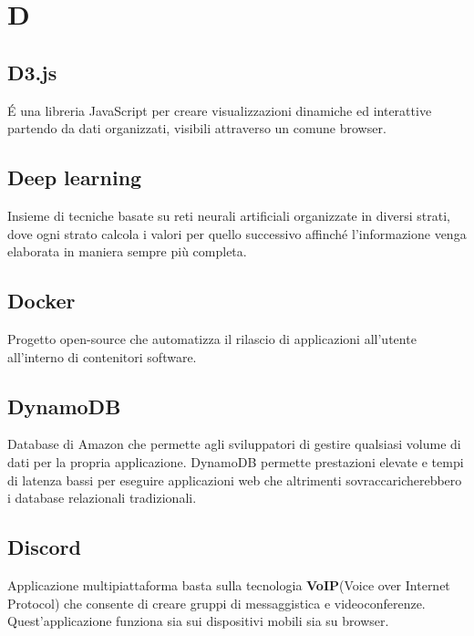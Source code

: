 \section*{D}
\markright{}
\subsection*{D3.js}
\'E una libreria JavaScript per creare visualizzazioni dinamiche ed interattive partendo da dati organizzati, visibili attraverso un comune browser.
\subsection*{Deep learning}
Insieme di tecniche basate su reti neurali artificiali organizzate in diversi strati, dove ogni strato calcola i valori per quello successivo affinché l'informazione venga elaborata in maniera sempre più completa.
\subsection*{Docker}
Progetto open-source che automatizza il rilascio di applicazioni all'utente all'interno di contenitori software.
\subsection*{DynamoDB}
Database  di Amazon che permette agli sviluppatori di gestire qualsiasi volume di dati per la propria applicazione. DynamoDB permette prestazioni elevate e tempi di latenza bassi per eseguire applicazioni web che altrimenti sovraccaricherebbero i database relazionali tradizionali.

\subsection*{Discord}
Applicazione multipiattaforma basta sulla tecnologia \textbf{VoIP}(Voice over Internet Protocol) che consente di creare gruppi di messaggistica e videoconferenze. Quest'applicazione funziona sia sui dispositivi mobili sia su browser.


